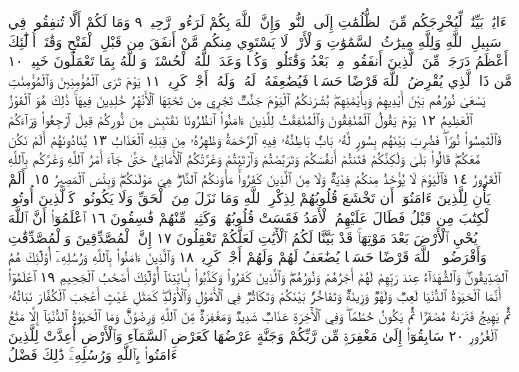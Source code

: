 ءَايَٰتِۭ بَيِّنَٰتࣲ لِّيُخْرِجَكُم مِّنَ ٱلظُّلُمَٰتِ إِلَى ٱلنُّورِۚ وَإِنَّ ٱللَّهَ بِكُمْ
لَرَءُوفࣱ رَّحِيمࣱ ٩ وَمَا لَكُمْ أَلَّا تُنفِقُوا۟ فِي سَبِيلِ ٱللَّهِ وَلِلَّهِ مِيرَٰثُ
ٱلسَّمَٰوَٰتِ وَٱلْأَرْضِۚ لَا يَسْتَوِي مِنكُم مَّنْ أَنفَقَ مِن قَبْلِ ٱلْفَتْحِ
وَقَٰتَلَۚ أُو۟لَٰٓئِكَ أَعْظَمُ دَرَجَةࣰ مِّنَ ٱلَّذِينَ أَنفَقُوا۟ مِنۢ بَعْدُ وَقَٰتَلُوا۟ۚ
وَكُلࣰّا وَعَدَ ٱللَّهُ ٱلْحُسْنَىٰۚ وَٱللَّهُ بِمَا تَعْمَلُونَ خَبِيرࣱ ١٠ مَّن ذَا
ٱلَّذِي يُقْرِضُ ٱللَّهَ قَرْضًا حَسَنࣰا فَيُضَٰعِفَهُۥ لَهُۥ وَلَهُۥٓ أَجْرࣱ كَرِيمࣱ ١١
يَوْمَ تَرَى ٱلْمُؤْمِنِينَ وَٱلْمُؤْمِنَٰتِ يَسْعَىٰ نُورُهُم بَيْنَ أَيْدِيهِمْ
وَبِأَيْمَٰنِهِمۖ بُشْرَىٰكُمُ ٱلْيَوْمَ جَنَّٰتࣱ تَجْرِي مِن تَحْتِهَا ٱلْأَنْهَٰرُ خَٰلِدِينَ
فِيهَاۚ ذَٰلِكَ هُوَ ٱلْفَوْزُ ٱلْعَظِيمُ ١٢ يَوْمَ يَقُولُ ٱلْمُنَٰفِقُونَ وَٱلْمُنَٰفِقَٰتُ
لِلَّذِينَ ءَامَنُوا۟ ٱنظُرُونَا نَقْتَبِسْ مِن نُّورِكُمْ قِيلَ ٱرْجِعُوا۟ وَرَآءَكُمْ
فَٱلْتَمِسُوا۟ نُورࣰاۖ فَضُرِبَ بَيْنَهُم بِسُورࣲ لَّهُۥ بَابُۢ بَاطِنُهُۥ فِيهِ ٱلرَّحْمَةُ
وَظَٰهِرُهُۥ مِن قِبَلِهِ ٱلْعَذَابُ ١٣ يُنَادُونَهُمْ أَلَمْ نَكُن مَّعَكُمْۖ قَالُوا۟ بَلَىٰ
وَلَٰكِنَّكُمْ فَتَنتُمْ أَنفُسَكُمْ وَتَرَبَّصْتُمْ وَٱرْتَبْتُمْ وَغَرَّتْكُمُ ٱلْأَمَانِيُّ
حَتَّىٰ جَآءَ أَمْرُ ٱللَّهِ وَغَرَّكُم بِٱللَّهِ ٱلْغَرُورُ ١٤ فَٱلْيَوْمَ لَا يُؤْخَذُ مِنكُمْ
فِدْيَةࣱ وَلَا مِنَ ٱلَّذِينَ كَفَرُوا۟ۚ مَأْوَىٰكُمُ ٱلنَّارُۖ هِيَ مَوْلَىٰكُمْۖ
وَبِئْسَ ٱلْمَصِيرُ ١٥۞ أَلَمْ يَأْنِ لِلَّذِينَ ءَامَنُوٓا۟ أَن تَخْشَعَ
قُلُوبُهُمْ لِذِكْرِ ٱللَّهِ وَمَا نَزَلَ مِنَ ٱلْحَقِّ وَلَا يَكُونُوا۟ كَٱلَّذِينَ
أُوتُوا۟ ٱلْكِتَٰبَ مِن قَبْلُ فَطَالَ عَلَيْهِمُ ٱلْأَمَدُ فَقَسَتْ قُلُوبُهُمْۖ وَكَثِيرࣱ
مِّنْهُمْ فَٰسِقُونَ ١٦ ٱعْلَمُوٓا۟ أَنَّ ٱللَّهَ يُحْيِ ٱلْأَرْضَ بَعْدَ مَوْتِهَاۚ قَدْ بَيَّنَّا
لَكُمُ ٱلْأٓيَٰتِ لَعَلَّكُمْ تَعْقِلُونَ ١٧ إِنَّ ٱلْمُصَّدِّقِينَ وَٱلْمُصَّدِّقَٰتِ
وَأَقْرَضُوا۟ ٱللَّهَ قَرْضًا حَسَنࣰا يُضَٰعَفُ لَهُمْ وَلَهُمْ أَجْرࣱ كَرِيمࣱ ١٨
وَٱلَّذِينَ ءَامَنُوا۟ بِٱللَّهِ وَرُسُلِهِۦٓ أُو۟لَٰٓئِكَ هُمُ ٱلصِّدِّيقُونَۖ وَٱلشُّهَدَآءُ
عِندَ رَبِّهِمْ لَهُمْ أَجْرُهُمْ وَنُورُهُمْۖ وَٱلَّذِينَ كَفَرُوا۟ وَكَذَّبُوا۟
بِـَٔايَٰتِنَآ أُو۟لَٰٓئِكَ أَصْحَٰبُ ٱلْجَحِيمِ ١٩ ٱعْلَمُوٓا۟ أَنَّمَا ٱلْحَيَوٰةُ
ٱلدُّنْيَا لَعِبࣱ وَلَهْوࣱ وَزِينَةࣱ وَتَفَاخُرُۢ بَيْنَكُمْ وَتَكَاثُرࣱ فِي ٱلْأَمْوَٰلِ
وَٱلْأَوْلَٰدِۖ كَمَثَلِ غَيْثٍ أَعْجَبَ ٱلْكُفَّارَ نَبَاتُهُۥ ثُمَّ يَهِيجُ فَتَرَىٰهُ
مُصْفَرࣰّا ثُمَّ يَكُونُ حُطَٰمࣰاۖ وَفِي ٱلْأٓخِرَةِ عَذَابࣱ شَدِيدࣱ وَمَغْفِرَةࣱ
مِّنَ ٱللَّهِ وَرِضْوَٰنࣱۚ وَمَا ٱلْحَيَوٰةُ ٱلدُّنْيَآ إِلَّا مَتَٰعُ ٱلْغُرُورِ ٢٠
سَابِقُوٓا۟ إِلَىٰ مَغْفِرَةࣲ مِّن رَّبِّكُمْ وَجَنَّةٍ عَرْضُهَا كَعَرْضِ ٱلسَّمَآءِ
وَٱلْأَرْضِ أُعِدَّتْ لِلَّذِينَ ءَامَنُوا۟ بِٱللَّهِ وَرُسُلِهِۦۚ ذَٰلِكَ فَضْلُ
